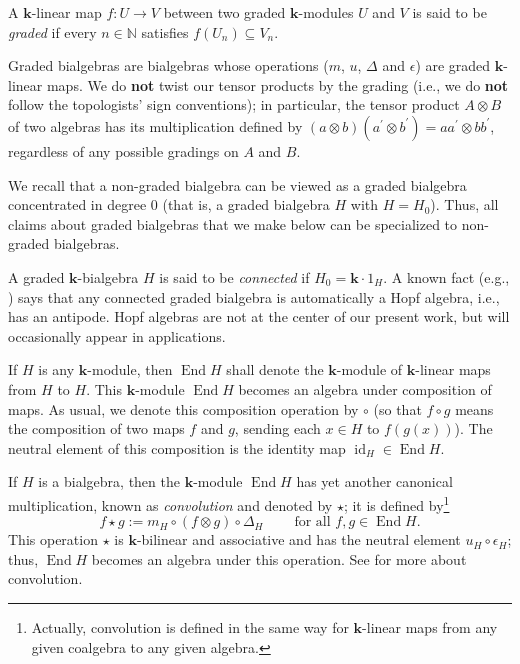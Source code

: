 \documentclass[numbers=enddot,12pt,final,onecolumn,notitlepage]{scrartcl}%
\theoremstyle{definition}
\begin{document}
A $\mathbf{k}$-linear map $f:U\rightarrow V$ between two graded $\mathbf{k}%
$-modules $U$ and $V$ is said to be \emph{graded} if every $n\in\mathbb{N}$
satisfies $f\left(  U_{n}\right)  \subseteq V_{n}$.

Graded bialgebras are bialgebras whose operations ($m$, $u$, $\Delta$ and
$\epsilon$) are graded $\mathbf{k}$-linear maps. We do \textbf{not} twist our
tensor products by the grading (i.e., we do \textbf{not} follow the
topologists' sign conventions); in particular, the tensor product $A\otimes B$
of two algebras has its multiplication defined by $\left(  a\otimes b\right)
\left(  a^{\prime}\otimes b^{\prime}\right)  =aa^{\prime}\otimes bb^{\prime}$,
regardless of any possible gradings on $A$ and $B$.

We recall that a non-graded bialgebra can be viewed as a graded bialgebra
concentrated in degree $0$ (that is, a graded bialgebra $H$ with $H=H_{0}$).
Thus, all claims about graded bialgebras that we make below can be specialized
to non-graded bialgebras.

A graded $\mathbf{k}$-bialgebra $H$ is said to be \emph{connected} if
$H_{0}=\mathbf{k}\cdot1_{H}$. A known fact (e.g., \cite[Proposition
1.4.16]{GriRei}) says that any connected graded bialgebra is automatically a
Hopf algebra, i.e., has an antipode. Hopf algebras are not at the center of
our present work, but will occasionally appear in applications.

If $H$ is any $\mathbf{k}$-module, then $\operatorname*{End}H$ shall denote
the $\mathbf{k}$-module of $\mathbf{k}$-linear maps from $H$ to $H$. This
$\mathbf{k}$-module $\operatorname*{End}H$ becomes an algebra under
composition of maps. As usual, we denote this composition operation by $\circ$
(so that $f\circ g$ means the composition of two maps $f$ and $g$, sending
each $x\in H$ to $f\left(  g\left(  x\right)  \right)  $). The neutral element
of this composition is the identity map $\operatorname*{id}\nolimits_{H}%
\in\operatorname*{End}H$.

If $H$ is a bialgebra, then the $\mathbf{k}$-module $\operatorname*{End}H$ has
yet another canonical multiplication, known as \emph{convolution} and denoted
by $\star$; it is defined by\footnote{Actually, convolution is defined in the
same way for $\mathbf{k}$-linear maps from any given coalgebra to any given
algebra.}%
\[
f\star g:=m_{H}\circ\left(  f\otimes g\right)  \circ\Delta_{H}%
\ \ \ \ \ \ \ \ \ \ \text{for all }f,g\in\operatorname*{End}H.
\]
This operation $\star$ is $\mathbf{k}$-bilinear and associative and has the
neutral element $u_{H}\circ\epsilon_{H}$; thus, $\operatorname*{End}H$ becomes
an algebra under this operation. See \cite[Definition 1.4.1]{GriRei} for more
about convolution.
\end{document}
